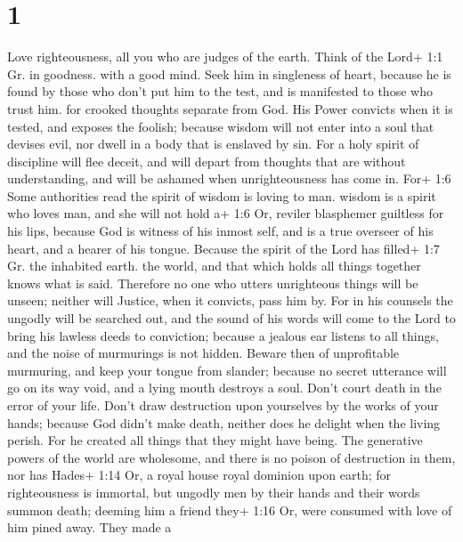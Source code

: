 \hypertarget{section}{%
\section{1}\label{section}}

 Love righteousness, all you who are judges of the earth.
Think of the Lord+ 1:1 Gr. in goodness. with a good mind. Seek him in
singleness of heart,  because he is found by those who don't
put him to the test, and is manifested to those who trust him.
 for crooked thoughts separate from God. His Power convicts
when it is tested, and exposes the foolish;  because wisdom
will not enter into a soul that devises evil, nor dwell in a body that
is enslaved by sin.  For a holy spirit of discipline will
flee deceit, and will depart from thoughts that are without
understanding, and will be ashamed when unrighteousness has come in.
 For+ 1:6 Some authorities read the spirit of wisdom is
loving to man. wisdom is a spirit who loves man, and she will not hold
a+ 1:6 Or, reviler blasphemer guiltless for his lips, because God is
witness of his inmost self, and is a true overseer of his heart, and a
hearer of his tongue.  Because the spirit of the Lord has
filled+ 1:7 Gr. the inhabited earth. the world, and that which holds all
things together knows what is said.  Therefore no one who
utters unrighteous things will be unseen; neither will Justice, when it
convicts, pass him by.  For in his counsels the ungodly will
be searched out, and the sound of his words will come to the Lord to
bring his lawless deeds to conviction;  because a jealous
ear listens to all things, and the noise of murmurings is not hidden.
 Beware then of unprofitable murmuring, and keep your
tongue from slander; because no secret utterance will go on its way
void, and a lying mouth destroys a soul.  Don't court death
in the error of your life. Don't draw destruction upon yourselves by the
works of your hands;  because God didn't make death,
neither does he delight when the living perish.  For he
created all things that they might have being. The generative powers of
the world are wholesome, and there is no poison of destruction in them,
nor has Hades+ 1:14 Or, a royal house royal dominion upon earth;
 for righteousness is immortal,  but ungodly
men by their hands and their words summon death; deeming him a friend
they+ 1:16 Or, were consumed with love of him pined away. They made a
